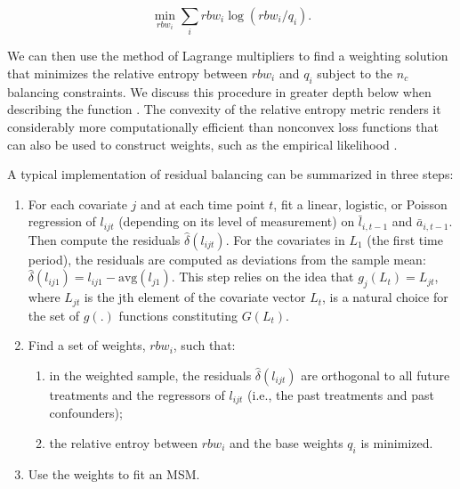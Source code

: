 \begin{equation}
\label{eq:7}
\min_{rbw_{i}}\sum_{i}rbw_{i}\log (rbw_{i}/q_{i}).
\end{equation}

We can then use the method of Lagrange multipliers to find a weighting
solution that minimizes the relative entropy between \(rbw_{i}\) and
\(q_{i}\) subject to the \(n_{c}\) balancing constraints. We discuss
this procedure in greater depth below when describing the function
. The convexity of the relative entropy metric renders
it considerably more computationally efficient than nonconvex loss
functions that can also be used to construct weights, such as the
empirical likelihood \citep{fongCovariateBalancingPropensity2018}.

A typical implementation of residual balancing can be summarized in
three steps:

\begin{enumerate}
\def\labelenumi{\arabic{enumi}.}
\tightlist
\item
  For each covariate \(j\) and at each time point \(t\), fit a linear,
  logistic, or Poisson regression of \(l_{ijt}\) (depending on its level
  of measurement) on \(\bar{l}_{i,t-1}\) and \(\bar{a}_{i,t-1}\). Then
  compute the residuals \(\hat{\delta}(l_{ijt})\). For the covariates in
  \(L_{1}\) (the first time period), the residuals are computed as
  deviations from the sample mean:
  \(\hat{\delta}(l_{ij1})=l_{ij1}-\text{avg}(l_{j1})\). This step relies
  on the idea that \(g_{j}(L_{t})=L_{jt}\), where \(L_{jt}\) is the jth
  element of the covariate vector \(L_{t}\), is a natural choice for the
  set of \(g(.)\) functions constituting \(G(L_{t})\).
\item
  Find a set of weights, \(rbw_{i}\), such that:

  \begin{enumerate}
  \def\labelenumii{\alph{enumii})}
  \tightlist
  \item
    in the weighted sample, the residuals \(\hat{\delta}(l_{ijt})\) are
    orthogonal to all future treatments and the regressors of
    \(l_{ijt}\) (i.e., the past treatments and past confounders);
  \item
    the relative entroy between \(rbw_{i}\) and the base weights
    \(q_{i}\) is minimized.
  \end{enumerate}
\item
  Use the weights to fit an MSM.
\end{enumerate}

